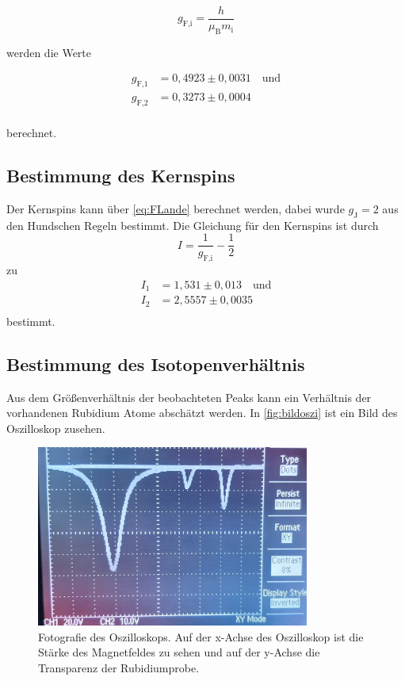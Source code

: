 \begin{equation*}
    g_{\text{F,i}} = \dfrac{h}{\mu_\text{B} m_\text{i}}
\end{equation*}

werden die Werte

\begin{align*}
    g_{\text{F,1}} &= 0,4923 \pm 0,0031 \quad \text{und} \\
    g_{\text{F,2}} &= 0,3273 \pm 0,0004           \\
\end{align*}

berechnet.

\subsection{Bestimmung des Kernspins}

Der Kernspins kann über \eqref{eq:FLande} berechnet werden, dabei wurde $g_\text{J} = 2$ aus den Hundschen Regeln bestimmt.
Die Gleichung für den Kernspins ist durch 
\begin{equation*}
    I = \dfrac{1}{g_{\text{F,i}}} - \dfrac{1}{2}
\end{equation*}
zu 
\begin{align*}
    I_1 &= 1,531  \pm 0,013  \quad \text{und} \\
    I_2 &= 2,5557 \pm 0,0035           \\
\end{align*}
bestimmt.

\subsection{Bestimmung des Isotopenverhältnis}

Aus dem Größenverhältnis der beobachteten Peaks kann ein Verhältnis der vorhandenen Rubidium Atome abschätzt werden.  
In \autoref{fig:bildoszi} ist ein Bild des Oszilloskop zusehen.

\begin{figure}[H]
    \centering
    \includegraphics[width=0.8\textwidth]{Messdaten/v21_oszi.pdf}
    \caption{Fotografie des Oszilloskops. Auf der x-Achse des Oszilloskop ist die Stärke des Magnetfeldes zu sehen und auf der y-Achse die Transparenz der Rubidiumprobe.}
    \label{fig:bildoszi}
\end{figure}

